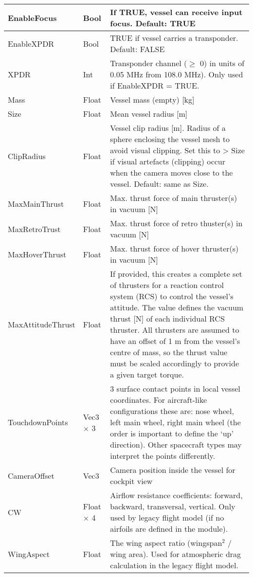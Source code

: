 \documentclass[Orbiter Developer Manual.tex]{subfiles}
\begin{document}
\begin{longtable}{ |p{}|p{}|p{}| }
	EnableFocus & Bool & If TRUE, vessel can receive input focus. Default: TRUE\\
	\hline\rule{0pt}{2ex}
	EnableXPDR & Bool & TRUE if vessel carries a transponder. Default: FALSE\\
	\hline\rule{0pt}{2ex}
	XPDR & Int & Transponder channel ($\geq$ 0) in units of 0.05 MHz from 108.0 MHz). Only used if EnableXPDR = TRUE.\\
	\hline\rule{0pt}{2ex}
	Mass & Float & Vessel mass (empty) [kg]\\
	\hline\rule{0pt}{2ex}
	Size & Float & Mean vessel radius [m]\\
	\hline\rule{0pt}{2ex}
	ClipRadius & Float & Vessel clip radius [m]. Radius of a sphere enclosing the vessel mesh to avoid visual clipping. Set this to > Size if visual artefacts (clipping) occur when the camera moves close to the vessel. Default: same as Size.\\
	\hline\rule{0pt}{2ex}
	MaxMainThrust & Float & Max. thrust force of main thruster(s) in vacuum [N]\\
	\hline\rule{0pt}{2ex}
	MaxRetroTrust & Float & Max. thrust force of retro thuster(s) in vacuum [N]\\
	\hline\rule{0pt}{2ex}
	MaxHoverThrust & Float & Max. thrust force of hover thruster(s) in vacuum [N]\\
	\hline\rule{0pt}{2ex}
	MaxAttitudeThrust & Float & If provided, this creates a complete set of thrusters for a reaction control system (RCS) to control the vessel’s attitude. The value defines the vacuum thrust [N] of each individual RCS thruster. All thrusters are assumed to have an offset of 1 m from the vessel’s centre of mass, so the thrust value must be scaled accordingly to provide a given target torque.\\
	\hline\rule{0pt}{2ex}
	TouchdownPoints & Vec3 × 3 & 3 surface contact points in local vessel coordinates. For aircraft-like configurations these are: nose wheel, left main wheel, right main wheel (the order is important to define the ‘up’ direction). Other spacecraft types may interpret the points differently.\\
	\hline\rule{0pt}{2ex}
	CameraOffset & Vec3 & Camera position inside the vessel for cockpit view\\
	\hline\rule{0pt}{2ex}
	CW & Float × 4 & Airflow resistance coefficients: forward, backward, transversal, vertical. Only used by legacy flight model (if no airfoils are defined in the module).\\
	\hline\rule{0pt}{2ex}
	WingAspect & Float & The wing aspect ratio (wingspan$^{2}$ / wing area). Used for atmospheric drag calculation in the legacy flight model.\\

\end{longtable}
\end{document}
